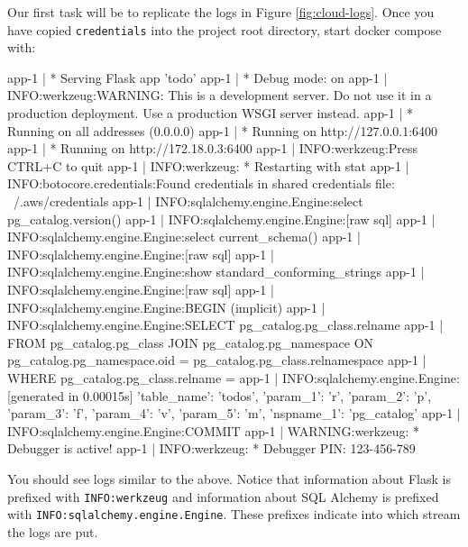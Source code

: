 \documentclass{csse4400}
\begin{document}
Our first task will be to replicate the logs in Figure \ref{fig:cloud-logs}.
Once you have copied \texttt{credentials} into the project root directory,
start docker compose with:

\begin{code}[numbers=none]{}
app-1       |  * Serving Flask app 'todo'
app-1       |  * Debug mode: on
app-1       | INFO:werkzeug:WARNING: This is a development server. Do not use it in a production deployment. Use a production WSGI server instead.
app-1       |  * Running on all addresses (0.0.0.0)
app-1       |  * Running on http://127.0.0.1:6400
app-1       |  * Running on http://172.18.0.3:6400
app-1       | INFO:werkzeug:Press CTRL+C to quit
app-1       | INFO:werkzeug: * Restarting with stat
app-1       | INFO:botocore.credentials:Found credentials in shared credentials file: ~/.aws/credentials
app-1       | INFO:sqlalchemy.engine.Engine:select pg_catalog.version()
app-1       | INFO:sqlalchemy.engine.Engine:[raw sql] {}
app-1       | INFO:sqlalchemy.engine.Engine:select current_schema()
app-1       | INFO:sqlalchemy.engine.Engine:[raw sql] {}
app-1       | INFO:sqlalchemy.engine.Engine:show standard_conforming_strings
app-1       | INFO:sqlalchemy.engine.Engine:[raw sql] {}
app-1       | INFO:sqlalchemy.engine.Engine:BEGIN (implicit)
app-1       | INFO:sqlalchemy.engine.Engine:SELECT pg_catalog.pg_class.relname
app-1       | FROM pg_catalog.pg_class JOIN pg_catalog.pg_namespace ON pg_catalog.pg_namespace.oid = pg_catalog.pg_class.relnamespace
app-1       | WHERE pg_catalog.pg_class.relname = %
app-1       | INFO:sqlalchemy.engine.Engine:[generated in 0.00015s] {'table_name': 'todos', 'param_1': 'r', 'param_2': 'p', 'param_3': 'f', 'param_4': 'v', 'param_5': 'm', 'nspname_1': 'pg_catalog'}
app-1       | INFO:sqlalchemy.engine.Engine:COMMIT
app-1       | WARNING:werkzeug: * Debugger is active!
app-1       | INFO:werkzeug: * Debugger PIN: 123-456-789
\end{code}

You should see logs similar to the above.
Notice that information about Flask is prefixed with \texttt{INFO:werkzeug} and information about SQL Alchemy is prefixed with \texttt{INFO:sqlalchemy.engine.Engine}.
These prefixes indicate into which stream the logs are put.
\end{document}

